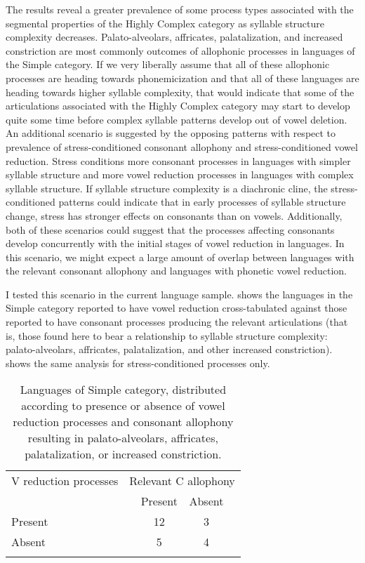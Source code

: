   The results reveal a greater prevalence of some process types associated with the segmental properties of the Highly Complex category as syllable structure complexity decreases. Palato-alveolars, affricates, palatalization, and increased constriction are most commonly outcomes of allophonic processes in languages of the Simple category. If we very liberally assume that all of these allophonic processes are heading towards phonemicization and that all of these languages are heading towards higher syllable complexity, that would indicate that some of the articulations associated with the Highly Complex category may start to develop quite some time before complex syllable patterns develop out of vowel deletion. An additional scenario is suggested by the opposing patterns with respect to prevalence of stress-conditioned consonant allophony and stress-conditioned vowel reduction. Stress conditions more consonant processes in languages with simpler syllable structure and more vowel reduction processes in languages with complex syllable structure. If syllable structure complexity is a diachronic cline, the stress-conditioned patterns could indicate that in early processes of syllable structure change, stress has stronger effects on consonants than on vowels. Additionally, both of these scenarios could suggest that the processes affecting consonants develop concurrently with the initial stages of vowel reduction in languages. In this scenario, we might expect a large amount of overlap between languages with the relevant consonant allophony and languages with phonetic vowel reduction.

  I tested this scenario in the current language sample.  shows the languages in the Simple category reported to have vowel reduction cross-tabulated against those reported to have consonant processes producing the relevant articulations (that is, those found here to bear a relationship to syllable structure complexity: palato-alveolars, affricates, palatalization, and other increased constriction).  shows the same analysis for stress-conditioned processes only.

\begin{table}
\begin{tabular}{llccl}%
\lsptoprule
 {V reduction processes} & \multicolumn{4}{c}{Relevant C allophony}\\\cmidrule(lr){2-5}
                         & & {Present} & {Absent} &\\\midrule
 {Present} & & 12 & 3 &\\
 {Absent} & & 5 & 4 &\\
\lspbottomrule
\end{tabular}
\caption{\label{tab:7.10}Languages of Simple category, distributed according to presence or absence of vowel reduction processes and consonant allophony resulting in palato-alveolars, affricates, palatalization, or increased constriction.}
\end{table}




